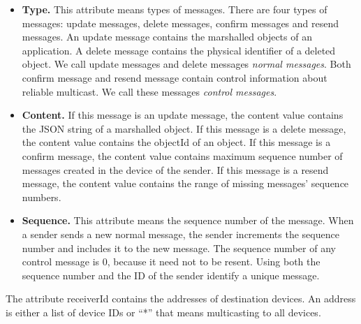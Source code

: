 \documentclass[twocolumn,10pt]{article}
\begin{document}
\begin{itemize}
	\setlength{\itemsep}{1pt}
	\setlength{\parskip}{0pt}
	\setlength{\parsep}{0pt}
	\item \textbf{Type.}
	This attribute means types of messages.
	There are four types of messages: update messages, delete messages, confirm messages and resend messages.
	An update message contains the marshalled objects of an application.
	A delete message contains the physical identifier of a deleted object.
	We call update messages and delete messages \emph{normal messages}. 
	Both confirm message and resend message contain control information about reliable multicast. 
	We call these messages \emph{control messages}.
	\item \textbf{Content.} 
	If this message is an update message, the content value contains the JSON string of a marshalled object.
	If this message is a delete message, the content value contains the objectId of an object.
	If this message is a confirm message, the content value contains maximum sequence number of messages created in the device of the sender.
	If this message is a resend message, the content value contains the range of missing messages' sequence numbers.
	\item \textbf{Sequence.}
	This attribute means the sequence number of the message.
	When a sender sends a new normal message, the sender increments the sequence number and includes it to the new message.
	The sequence number of any control message is 0, because it need not to be resent.
	Using both the sequence number and the ID of the sender identify a unique message.
\end{itemize}

The attribute receiverId contains the addresses of destination devices.
An address is either a list of device IDs or ``*'' that means multicasting to all devices.
\end{document}
